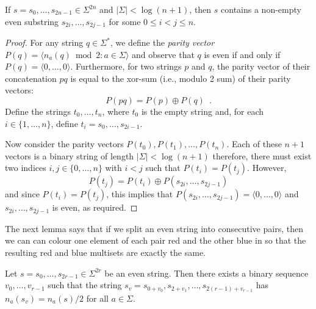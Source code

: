 \documentclass{patmorin}
\begin{document}
\begin{lem}
  If $s=s_0,\ldots,s_{2n-1}\in\Sigma^{2n}$ and $|\Sigma|< \log(n+1)$,
  then $s$ contains a non-empty even substring $s_{2i},\ldots,s_{2j-1}$
  for some $0\le i < j\le n$.
\end{lem}

\begin{proof}
  For any string $q\in\Sigma^*$, we define the \emph{parity vector}
  $P(q)=\langle n_a(q)\bmod 2: a\in\Sigma \rangle$ and observe that $q$ is
  even if and only if $P(q)=\langle 0,\ldots,0\rangle$.   Furthermore, for
  two strings $p$ and $q$, the parity vector of their concatenation $pq$
  is equal to the xor-sum (i.e., modulo 2 sum) of their parity vectors:
  \[
     P(pq) = P(p)\oplus P(q) \enspace .
  \] 
  Define the strings $t_0,\ldots,t_n$, where $t_0$ is the empty string
  and, for each $i\in\{1,\ldots,n\}$, define $t_i=s_0,\ldots,s_{2i-1}$.

  Now consider the parity vectors $P(t_0),P(t_1),\ldots,P(t_n)$.
  Each of these $n+1$ vectors is a binary string of length
  $|\Sigma| < \log(n+1)$ therefore, there must exist two indices
  $i,j\in\{0,\ldots,n\}$ with $i<j$ such that $P(t_i)=P(t_j)$.  However,
  \[
      P(t_j) = P(t_i) \oplus P(s_{2i},\ldots,s_{2j-1}) 
  \]
  and since $P(t_i)=P(t_j)$, this implies that $P(s_{2i},\ldots,s_{2j-1})=\langle0,\ldots,0\rangle$
  and $s_{2i},\ldots,s_{2j-1}$ is even, as required.
\end{proof}


The next lemma says that if we split an even string into consecutive
pairs, then we can can colour one element of each pair red and the other
blue in so that the resulting red and blue multisets are exactly
the same.
\begin{lem}
  Let $s=s_0,\ldots,s_{2r-1}\in\Sigma^{2r}$ be an even string. Then there
  exists a binary sequence $v_0,\ldots,v_{r-1}$ such that the string
  $s_v=s_{0+v_0},s_{2+v_1},\ldots,s_{2(r-1)+v_{r-1}}$ 
  has $n_a(s_v)=n_a(s)/2$
  for all $a\in\Sigma$.
\end{lem}
\end{document}
